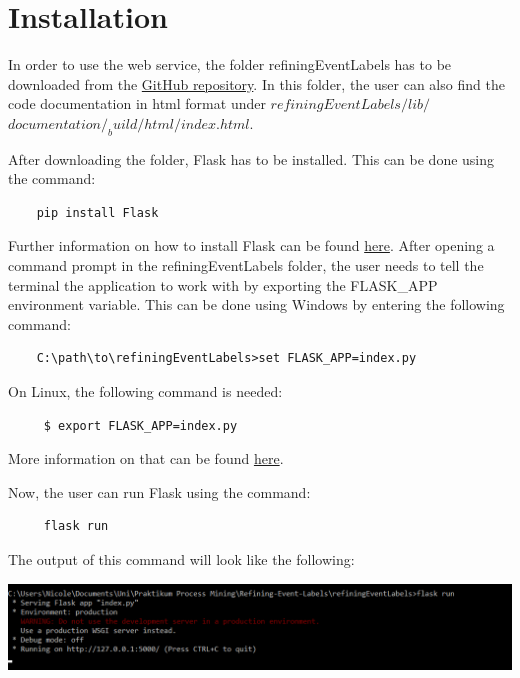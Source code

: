 \documentclass[notitlepage]{article}
\begin{document}
\section{Installation}

In order to use the web service, the folder refiningEventLabels has to be downloaded from the \href{https://github.com/NicoleVentsch/Refining-Event-Labels}{GitHub repository}. In this folder, the user can also find the code documentation in html format under $refiningEventLabels/lib/$ $documentation/_build/html/index.html$. 

After downloading the folder, Flask has to be installed. This can be done using the command:

\begin{lstlisting}
	pip install Flask 
\end{lstlisting}

Further information on how to install Flask can be found \href{http://flask.pocoo.org/docs/1.0/installation/}{here}. After opening a command prompt in the refiningEventLabels folder, the user needs to tell the terminal the application to work with by exporting the FLASK\_APP environment variable. This can be done using Windows by entering the following command:

\begin{lstlisting}
	C:\path\to\refiningEventLabels>set FLASK_APP=index.py
\end{lstlisting}
 
On Linux, the following command is needed:

\begin{lstlisting}
	 $ export FLASK_APP=index.py
\end{lstlisting}

More information on that can be found \href{http://flask.pocoo.org/docs/1.0/quickstart/}{here}.

\medskip

Now, the user can run Flask using the command:
\begin{lstlisting}
	 flask run
\end{lstlisting}

The output of this command will look like the following:


\includegraphics[scale=0.7]{Flask.png}
\end{document}
